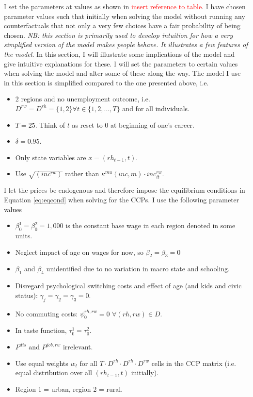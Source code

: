 

I set the parameters at values as shown in \textcolor{red}{insert reference to table}. I have chosen parameter values such that initially when solving the model without running any counterfactuals that not only a very few choices have a fair probability of being chosen. 
\textit{NB: this section is primarily used to develop intuition for how a very simplified version of the model makes people behave. It illustrates a few features of the model.}
In this section, I will illustrate some implications of the model and give intuitive explanations for these. I will set the parameters to certain values when solving the model and alter some of these along the way. The model I use in this section is simplified compared to the one presented above, i.e.

\begin{itemize}
\item 2 regions and no unemployment outcome, i.e. $D^{rw}=D^{rh}=\{1,2\} \forall t\in\{1,2,...,T\}$ and for all individuals.
\item $T=25$. Think of $t$ as reset to 0 at beginning of one's career.
\item $\delta=0.95$.
\item Only state variables are $x=(rh_{t-1},t)$.
\item Use $\sqrt{(inc^{rw})}$ rather than $\kappa^{mu}(inc,m)\cdot inc_{it}^{rw}$.
\end{itemize}

I let the prices be endogenous and therefore impose the equilibrium conditions in Equation \ref{eq:eqcond} when solving for the CCPs. I use the following parameter values 
\begin{itemize}
\item $\beta_0^1=\beta_0^2=1,000$ is the constant base wage in each region denoted in some units. 
\item Neglect impact of age on wages for now, so $\beta_2=\beta_3=0$
\item $\beta_1$ and $\beta_4$ unidentified due to no variation in macro state and schooling.
\item Disregard psychological switching costs and effect of age (and kids and civic status): $\gamma_j=\gamma_2=\gamma_3=0$.
\item No commuting costs: $\psi_0^{rh,rw}=0$ $\forall (rh,rw)\in D$. 
\item In taste function, $\tau_0^1=\tau_0^2$.
\item $P^{dis}$ and $P^{job,rw}$ irrelevant.
\item Use equal weights $w_t$ for all $T\cdot D^{rh}\cdot D^{rh}\cdot D^{rw}$ cells in the CCP matrix (i.e. equal distribution over all $(rh_{t-1},t)$ initially).
\item Region 1 = urban, region 2 = rural.

\end{itemize}

